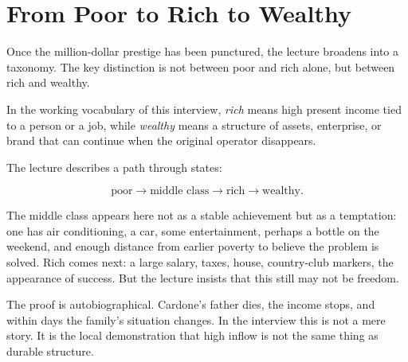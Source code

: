 \section{From Poor to Rich to Wealthy}

Once the million-dollar prestige has been punctured, the lecture broadens into a taxonomy. The key distinction is not between poor and rich alone, but between rich and wealthy.

\begin{definition}
In the working vocabulary of this interview, \emph{rich} means high present income tied to a person or a job, while \emph{wealthy} means a structure of assets, enterprise, or brand that can continue when the original operator disappears.
\end{definition}

The lecture describes a path through states:

\begin{equation}
\text{poor}\to\text{middle class}\to\text{rich}\to\text{wealthy}.
\end{equation}

The middle class appears here not as a stable achievement but as a temptation: one has air conditioning, a car, some entertainment, perhaps a bottle on the weekend, and enough distance from earlier poverty to believe the problem is solved. Rich comes next: a large salary, taxes, house, country-club markers, the appearance of success. But the lecture insists that this still may not be freedom.

The proof is autobiographical. Cardone's father dies, the income stops, and within days the family's situation changes. In the interview this is not a mere story. It is the local demonstration that high inflow is not the same thing as durable structure.

\begin{figure}[h]
\centering
{}
\end{figure}


